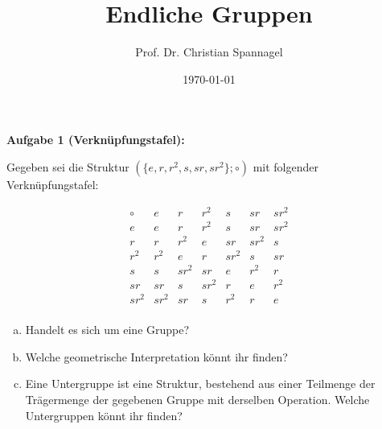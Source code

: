 \documentclass{cssheet}
\title{Endliche Gruppen}
\author{Prof. Dr. Christian Spannagel}
\date{\today}
\begin{document}
\printtitle


\textbf{Aufgabe 1 (Verknüpfungstafel):} 

Gegeben sei die Struktur  $(\{e,r,r^2,s,sr,sr^2\};\circ)$  mit folgender Verknüpfungstafel:

\[
\begin{array}{c|cccccc}
	\circ & e & r & r^2 & s & sr & sr^2 \\
	\hline
	e     & e & r & r^2 & s & sr & sr^2 \\
	r     & r & r^2 & e & sr & sr^2 & s \\
	r^2   & r^2 & e & r & sr^2 & s & sr \\
	s     & s & sr^2 & sr & e & r^2 & r \\
	sr    & sr & s & sr^2 & r & e & r^2 \\
	sr^2  & sr^2 & sr & s & r^2 & r & e \\
\end{array}
\]


\begin{enumerate}[a)]
\item Handelt es sich um eine Gruppe?
\item Welche geometrische Interpretation könnt ihr finden?
\item Eine Untergruppe ist eine Struktur, bestehend aus einer Teilmenge der Trägermenge der gegebenen Gruppe mit derselben Operation. Welche Untergruppen könnt ihr finden?
\end{enumerate}



\vspace*{2cm}
\printlicense

\printsocials
\end{document}
